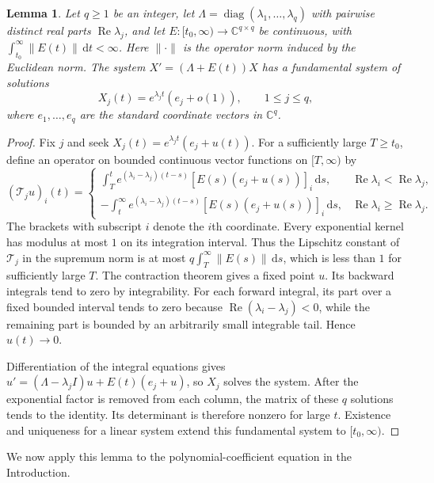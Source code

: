 \documentclass[11pt,letterpaper,reqno]{amsart}
\newtheorem{lem}[thm]{Lemma}
\theoremstyle{remark}
\numberwithin{equation}{section}
\newcommand{\C}{\mathbb C}
\DeclareMathOperator{\Ree}{Re}
\begin{document}
\begin{lem}\label{lem:integrable-system}
Let $q\geq1$ be an integer, let $\Lambda=\operatorname{diag}(\lambda_1,\ldots,\lambda_q)$
with pairwise distinct real parts $\Ree\lambda_j$, and let
$E\colon[t_0,\infty)\to\C^{q\times q}$ be continuous, with
$\int_{t_0}^\infty\|E(t)\|\,\mathrm dt<\infty$. Here $\|\cdot\|$ is the
operator norm induced by the Euclidean norm. The system
$X'=(\Lambda+E(t))X$ has a fundamental system of solutions
\[
 X_j(t)=e^{\lambda_jt}(e_j+o(1)),\qquad 1\leq j\leq q,
\]
where $e_1,\ldots,e_q$ are the standard coordinate vectors in $\C^q$.
\end{lem}
\begin{proof}
Fix $j$ and seek $X_j(t)=e^{\lambda_jt}(e_j+u(t))$. For a sufficiently
large $T\geq t_0$, define an operator on bounded continuous vector
functions on $[T,\infty)$ by
\[
 (\mathcal T_j u)_i(t)=
 \begin{cases}
 \displaystyle\int_T^t e^{(\lambda_i-\lambda_j)(t-s)}
           [E(s)(e_j+u(s))]_i\,\mathrm ds,
           &\Ree\lambda_i<\Ree\lambda_j,\\[2mm]
 \displaystyle-\int_t^\infty e^{(\lambda_i-\lambda_j)(t-s)}
           [E(s)(e_j+u(s))]_i\,\mathrm ds,
           &\Ree\lambda_i\geq\Ree\lambda_j.
 \end{cases}
\]
The brackets with subscript $i$ denote the $i$th coordinate.
Every exponential kernel has modulus at most $1$ on its integration
interval. Thus the Lipschitz constant of $\mathcal T_j$ in the supremum
norm is at most $q\int_T^\infty\|E(s)\|\,\mathrm ds$, which is less than
$1$ for sufficiently large $T$. The contraction theorem gives a fixed
point $u$. Its backward integrals tend to zero by integrability. For each
forward integral, its part over a fixed bounded interval tends to zero
because $\Ree(\lambda_i-\lambda_j)<0$, while the remaining part is bounded
by an arbitrarily small integrable tail. Hence $u(t)\to0$.

Differentiation of the integral equations gives
$u'=(\Lambda-\lambda_j I)u+E(t)(e_j+u)$, so $X_j$ solves the system.
After the exponential factor is removed from each column, the matrix of
these $q$ solutions tends to the identity. Its determinant is therefore
nonzero for large $t$. Existence and uniqueness for a linear system extend
this fundamental system to $[t_0,\infty)$.
\end{proof}

We now apply this lemma to the polynomial-coefficient equation in the
Introduction.
\end{document}
